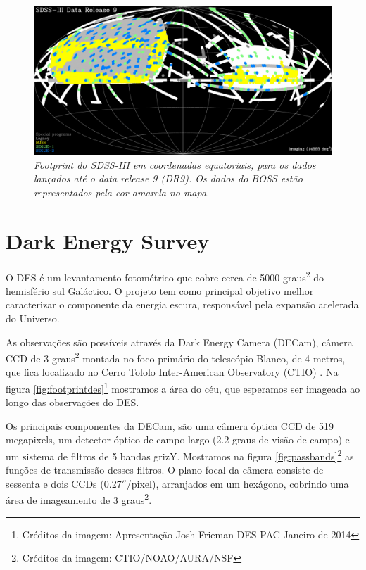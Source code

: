\documentclass[
	12pt,				%
	openany,			%
	oneside,			%
	a4paper,			%
	english,			%
	brazil				%
	]{abntex2}
\begin{document}
\begin{figure}[h]
\begin{center}
\includegraphics[width=12cm]{figuras/footprintsdss.pdf}
\caption{\textit{Footprint do SDSS-III em coordenadas equatoriais, para os dados lançados até o data release 9 (DR9). Os dados do BOSS estão representados pela cor amarela no mapa.}}
\label{fig:footprintsdss}
\end{center}
\end{figure}
\vspace{0.5cm}

\section{Dark Energy Survey}

O DES \cite{2005astro.ph.10346T} é um levantamento fotométrico que cobre  cerca de 5000 graus\textsuperscript{2} do hemisfério sul Galáctico. O projeto tem como principal objetivo melhor caracterizar o componente da energia escura, responsável pela expansão acelerada do Universo. \par
As observações são possíveis através da Dark Energy Camera (DECam), câmera CCD de 3 graus\textsuperscript{2} montada no foco primário do telescópio Blanco, de 4 metros, que fica localizado no Cerro Tololo Inter-American Observatory (CTIO) \cite{2015AJ....150..150F}. Na figura \ref{fig:footprintdes}\footnote{Créditos da imagem: Apresentação Josh Frieman DES-PAC Janeiro de 2014} mostramos a área do céu, que esperamos ser imageada ao longo  das observações do DES. \par

Os principais componentes da DECam, são uma câmera óptica CCD de 519 megapixels, um detector  óptico de campo largo (2.2 graus de visão de campo) e um sistema de filtros de 5 bandas grizY. Mostramos na figura \ref{fig:passbands}\footnote{Créditos da imagem: CTIO/NOAO/AURA/NSF} as funções de transmissão desses filtros. O plano focal da câmera consiste de sessenta e dois CCDs (0.27$''$/pixel), arranjados em um hexágono, cobrindo uma área de imageamento de 3 graus\textsuperscript{2}. \par 
\end{document}
